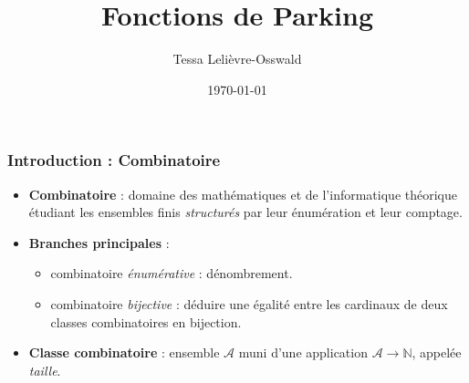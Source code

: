 \documentclass{beamer}
\title{Fonctions de Parking}
\author{Tessa Lelièvre-Osswald}
\institute{Encadrant : Matthieu Josuat-Vergès \\ IRIF - Pôle Combinatoire}
\date{\today}
\begin{document}
\frame{\titlepage}

\begin{frame}
    \frametitle{Introduction : Combinatoire}
    \begin{itemize}
        \item \textbf{Combinatoire} : domaine des mathématiques et de 
        l'informatique théorique étudiant les ensembles finis
        \emph{structurés} par leur énumération et leur comptage.
        \item \textbf{Branches principales} :
        \begin{itemize}
            \item combinatoire \emph{énumérative} : dénombrement.
            \item combinatoire \emph{bijective} : déduire une égalité
            entre les cardinaux de deux classes combinatoires  en bijection.
        \end{itemize}

        \item \textbf{Classe combinatoire} : ensemble $\mathcal{A}$ muni
        d'une application $\mathcal{A} \to \mathbb{N}$, appelée \emph{taille}. 
    \end{itemize}
\end{frame}
\end{document}
